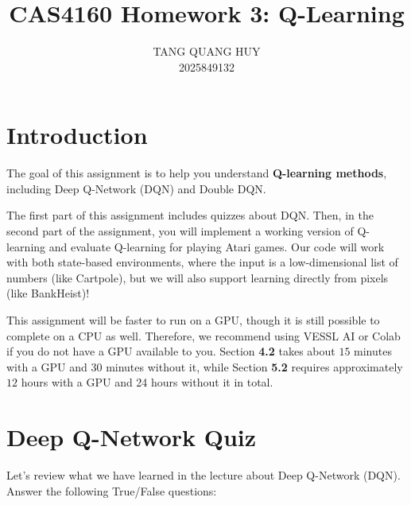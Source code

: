 \documentclass{article}
\title{CAS4160 Homework 3: Q-Learning}
\author{
    TANG QUANG HUY \\
    2025849132
}
\begin{document}
\maketitle



\section{Introduction}

The goal of this assignment is to help you understand \textbf{Q-learning methods}, including Deep Q-Network (DQN) and Double DQN.

The first part of this assignment includes quizzes about DQN. Then, in the second part of the assignment, you will implement a working version of Q-learning and evaluate Q-learning for playing Atari games. Our code will work with both state-based environments, where the input is a low-dimensional list of numbers (like Cartpole), but we will also support learning directly from pixels (like BankHeist)!

This assignment will be faster to run on a GPU, though it is still possible to complete on a CPU as well. Therefore, we recommend using VESSL AI or Colab if you do not have a GPU available to you. Section \textbf{4.2} takes about $15$ minutes with a GPU and 30 minutes without it, while Section \textbf{5.2} requires approximately $12$ hours with a GPU and 24 hours without it in total.



\section{Deep Q-Network Quiz}

Let's review what we have learned in the lecture about Deep Q-Network (DQN). Answer the following True/False questions:
\end{document}
